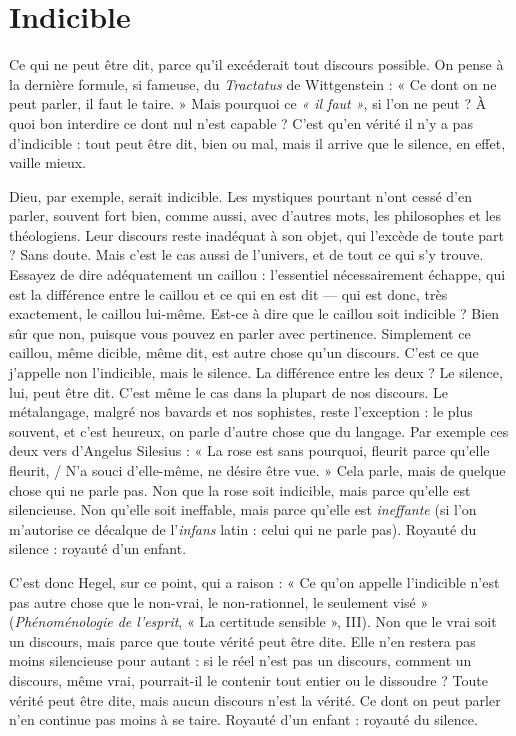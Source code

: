 \section{Indicible}
Ce qui ne peut être dit, parce qu’il excéderait tout discours
possible. On pense à la dernière formule, si fameuse, du {\it Tractatus}
de Wittgenstein : « Ce dont on ne peut parler, il faut le taire. » Mais pourquoi
ce {\it « il faut »}, si l’on ne peut ? À quoi bon interdire ce dont nul n’est
capable ? C’est qu’en vérité il n’y a pas d’indicible : tout peut être dit, bien ou
mal, mais il arrive que le silence, en effet, vaille mieux.

Dieu, par exemple, serait indicible. Les mystiques pourtant n’ont cessé d’en
parler, souvent fort bien, comme aussi, avec d’autres mots, les philosophes et
les théologiens. Leur discours reste inadéquat à son objet, qui l’excède de toute
part ? Sans doute. Mais c’est le cas aussi de l’univers, et de tout ce qui s’y
trouve. Essayez de dire adéquatement un caillou : l’essentiel nécessairement
échappe, qui est la différence entre le caillou et ce qui en est dit — qui est donc,
très exactement, le caillou lui-même. Est-ce à dire que le caillou soit indicible ?
Bien sûr que non, puisque vous pouvez en parler avec pertinence. Simplement
ce caillou, même dicible, même dit, est autre chose qu’un discours. C’est ce que
j'appelle non l’indicible, mais le silence. La différence entre les deux ? Le
silence, lui, peut être dit. C’est même le cas dans la plupart de nos discours. Le
métalangage, malgré nos bavards et nos sophistes, reste l’exception : le plus
souvent, et c’est heureux, on parle d’autre chose que du langage. Par exemple
ces deux vers d’Angelus Silesius : « La rose est sans pourquoi, fleurit parce
qu’elle fleurit, / N’a souci d’elle-même, ne désire être vue. » Cela parle, mais de
quelque chose qui ne parle pas. Non que la rose soit indicible, mais parce
qu’elle est silencieuse. Non qu’elle soit ineffable, mais parce qu’elle est {\it ineffante}
(si l’on m’autorise ce décalque de l’{\it infans} latin : celui qui ne parle pas). Royauté
du silence : royauté d’un enfant.

C’est donc Hegel, sur ce point, qui a raison : « Ce qu’on appelle l’indicible
n’est pas autre chose que le non-vrai, le non-rationnel, le seulement visé »
({\it Phénoménologie de l'esprit}, « La certitude sensible », III). Non que le vrai soit un
discours, mais parce que toute vérité peut être dite. Elle n’en restera pas moins
silencieuse pour autant : si le réel n’est pas un discours, comment un discours,
même vrai, pourrait-il le contenir tout entier ou le dissoudre ? Toute vérité
peut être dite, mais aucun discours n’est la vérité. Ce dont on peut parler n’en
continue pas moins à se taire. Royauté d’un enfant : royauté du silence.

